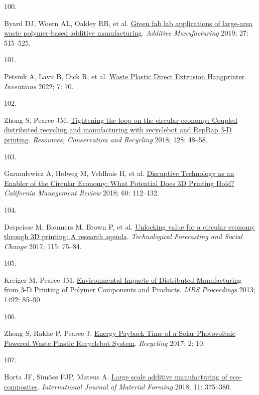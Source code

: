 \documentclass[
  12pt,
  a4paperpaper,
  onecolumn]{article}
\newlength{\cslhangindent}
\newlength{\csllabelwidth}
\newlength{\cslentryspacingunit} %
\newenvironment{CSLReferences}[2] %
 {%
  \setlength{\parindent}{0pt}
  \ifodd #1
  \let\oldpar\par
  \def\par{\hangindent=\cslhangindent\oldpar}
  \fi
  \setlength{\parskip}{#2\cslentryspacingunit}
 }%
 {}
\newcommand{\CSLLeftMargin}[1]{\parbox[t]{\csllabelwidth}{#1}}
\newcommand{\CSLRightInline}[1]{\parbox[t]{\linewidth - \csllabelwidth}{#1}\break}
\begin{document}
\begin{CSLReferences}{0}{0}
\leavevmode{}%
\CSLLeftMargin{100. }%
\CSLRightInline{Byard DJ, Woern AL, Oakley RB, et al.
\href{https://doi.org/10.1016/j.addma.2019.03.006}{Green fab lab
applications of large-area waste polymer-based additive manufacturing}.
\emph{Additive Manufacturing} 2019; 27: 515--525.}

\leavevmode{}%
\CSLLeftMargin{101. }%
\CSLRightInline{Petsiuk A, Lavu B, Dick R, et al.
\href{https://doi.org/10.3390/inventions7030070}{Waste {Plastic Direct
Extrusion Hangprinter}}. \emph{Inventions} 2022; 7: 70.}

\leavevmode{}%
\CSLLeftMargin{102. }%
\CSLRightInline{Zhong S, Pearce JM.
\href{https://doi.org/10.1016/j.resconrec.2017.09.023}{Tightening the
loop on the circular economy: {Coupled} distributed recycling and
manufacturing with recyclebot and {RepRap} 3-{D} printing}.
\emph{Resources, Conservation and Recycling} 2018; 128: 48--58.}

\leavevmode{}%
\CSLLeftMargin{103. }%
\CSLRightInline{Garmulewicz A, Holweg M, Veldhuis H, et al.
\href{https://doi.org/10.1177/0008125617752695}{Disruptive {Technology}
as an {Enabler} of the {Circular Economy}: {What Potential Does 3D
Printing Hold}?} \emph{California Management Review} 2018; 60:
112--132.}

\leavevmode{}%
\CSLLeftMargin{104. }%
\CSLRightInline{Despeisse M, Baumers M, Brown P, et al.
\href{https://doi.org/10.1016/j.techfore.2016.09.021}{Unlocking value
for a circular economy through {3D} printing: {A} research agenda}.
\emph{Technological Forecasting and Social Change} 2017; 115: 75--84.}

\leavevmode{}%
\CSLLeftMargin{105. }%
\CSLRightInline{Kreiger M, Pearce JM.
\href{https://doi.org/10.1557/opl.2013.319}{Environmental {Impacts} of
{Distributed Manufacturing} from 3-{D Printing} of {Polymer Components}
and {Products}}. \emph{MRS Proceedings} 2013; 1492: 85--90.}

\leavevmode{}%
\CSLLeftMargin{106. }%
\CSLRightInline{Zhong S, Rakhe P, Pearce J.
\href{https://doi.org/10.3390/recycling2020010}{Energy {Payback Time} of
a {Solar Photovoltaic Powered Waste Plastic Recyclebot System}}.
\emph{Recycling} 2017; 2: 10.}

\leavevmode{}%
\CSLLeftMargin{107. }%
\CSLRightInline{Horta JF, Simões FJP, Mateus A.
\href{https://doi.org/10.1007/s12289-017-1364-5}{Large scale additive
manufacturing of eco-composites}. \emph{International Journal of
Material Forming} 2018; 11: 375--380.}


\end{CSLReferences}
\end{document}
